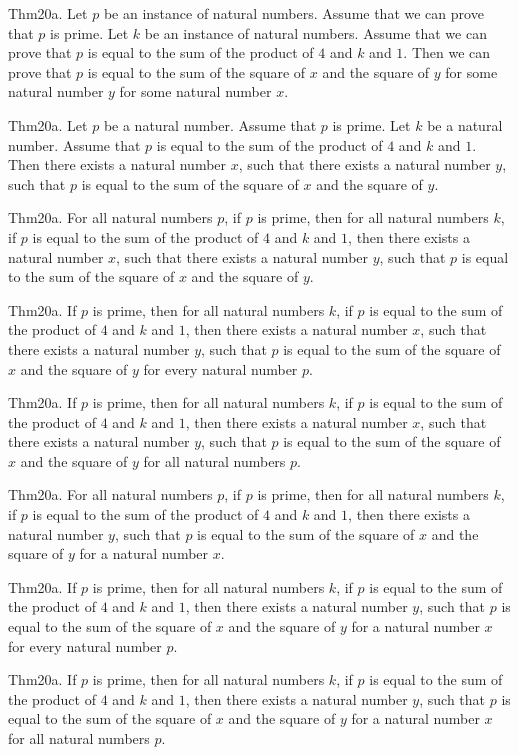 \documentclass{article}
\begin{document}
Thm20a. Let $p$ be an instance of natural numbers. Assume that we can prove that $p$ is prime. Let $k$ be an instance of natural numbers. Assume that we can prove that $p$ is equal to the sum of the product of $4$ and $k$ and $1$. Then we can prove that $p$ is equal to the sum of the square of $x$ and the square of $y$ for some natural number $y$ for some natural number $x$.

Thm20a. Let $p$ be a natural number. Assume that $p$ is prime. Let $k$ be a natural number. Assume that $p$ is equal to the sum of the product of $4$ and $k$ and $1$. Then there exists a natural number $x$, such that there exists a natural number $y$, such that $p$ is equal to the sum of the square of $x$ and the square of $y$.

Thm20a. For all natural numbers $p$, if $p$ is prime, then for all natural numbers $k$, if $p$ is equal to the sum of the product of $4$ and $k$ and $1$, then there exists a natural number $x$, such that there exists a natural number $y$, such that $p$ is equal to the sum of the square of $x$ and the square of $y$.

Thm20a. If $p$ is prime, then for all natural numbers $k$, if $p$ is equal to the sum of the product of $4$ and $k$ and $1$, then there exists a natural number $x$, such that there exists a natural number $y$, such that $p$ is equal to the sum of the square of $x$ and the square of $y$ for every natural number $p$.

Thm20a. If $p$ is prime, then for all natural numbers $k$, if $p$ is equal to the sum of the product of $4$ and $k$ and $1$, then there exists a natural number $x$, such that there exists a natural number $y$, such that $p$ is equal to the sum of the square of $x$ and the square of $y$ for all natural numbers $p$.

Thm20a. For all natural numbers $p$, if $p$ is prime, then for all natural numbers $k$, if $p$ is equal to the sum of the product of $4$ and $k$ and $1$, then there exists a natural number $y$, such that $p$ is equal to the sum of the square of $x$ and the square of $y$ for a natural number $x$.

Thm20a. If $p$ is prime, then for all natural numbers $k$, if $p$ is equal to the sum of the product of $4$ and $k$ and $1$, then there exists a natural number $y$, such that $p$ is equal to the sum of the square of $x$ and the square of $y$ for a natural number $x$ for every natural number $p$.

Thm20a. If $p$ is prime, then for all natural numbers $k$, if $p$ is equal to the sum of the product of $4$ and $k$ and $1$, then there exists a natural number $y$, such that $p$ is equal to the sum of the square of $x$ and the square of $y$ for a natural number $x$ for all natural numbers $p$.
\end{document}
